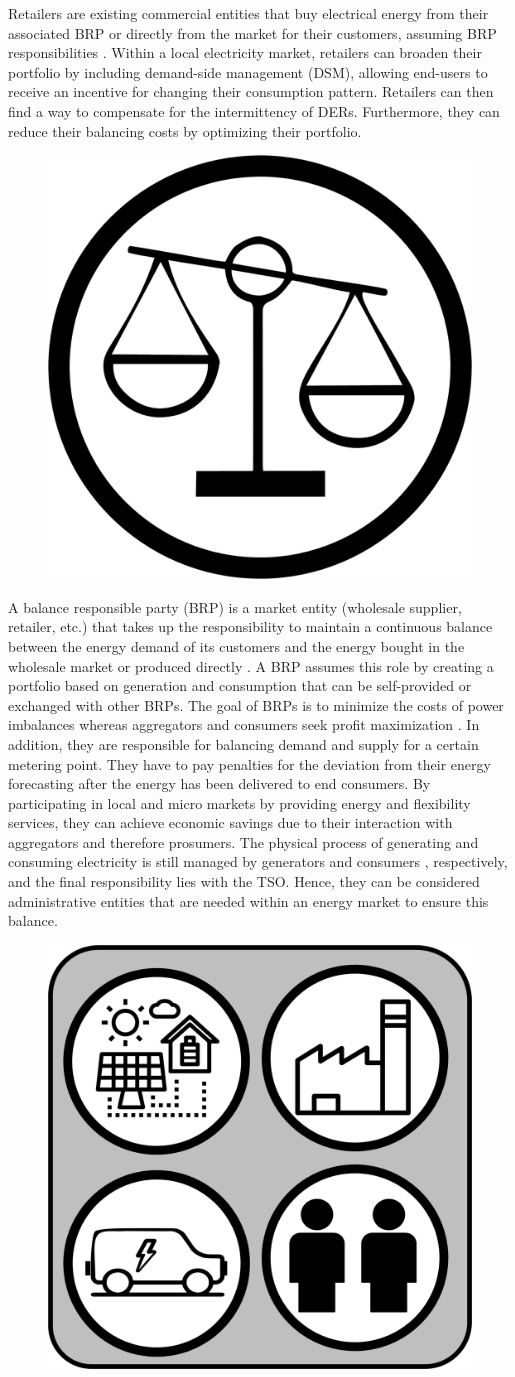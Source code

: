 Retailers are existing commercial entities that buy electrical energy from their associated BRP or directly from the market for their customers, assuming BRP responsibilities \cite{VILLAR2018Flexibility}. Within a local electricity market, retailers can broaden their portfolio by including demand-side management (DSM), allowing end-users to receive an incentive for changing their consumption pattern. Retailers can then find a way to compensate for the intermittency of DERs. Furthermore, they can reduce their balancing costs by optimizing their portfolio. \\

\begin{figure}
	\centering
	\includegraphics[width=0.1\columnwidth ]{ChapterIntro/Figures/BRP.jpg}
	\label{BRP}  
\end{figure}

A balance responsible party (BRP) is a market entity (wholesale supplier, retailer, etc.) that takes up the responsibility to maintain a continuous balance between the energy demand of its customers and the energy bought in the wholesale market or produced directly \cite{mandatova2014flexibility}. A BRP assumes this role by creating a portfolio based on generation and consumption that can be self-provided or exchanged with other BRPs. The goal of BRPs is to minimize the costs of power imbalances whereas aggregators and consumers seek profit maximization \cite{torbaghan2016local}. In addition, they are responsible for balancing demand and supply for a certain metering point. They have to pay penalties for the deviation from their energy forecasting after the energy has been delivered to end consumers. By participating in local and micro markets by providing energy and flexibility services, they can achieve economic savings due to their interaction with aggregators and therefore prosumers. The physical process of generating and consuming electricity is still managed by generators and consumers \cite{KULEnergyInstitute2015}, respectively, and the final responsibility lies with the TSO. Hence, they can be considered administrative entities that are needed within an energy market to ensure this balance.\\


\begin{figure}
	\centering
	\includegraphics[width=0.1\columnwidth ]{ChapterIntro/Figures/Prosumer.jpg}
	\label{Prosumer}  
\end{figure}

